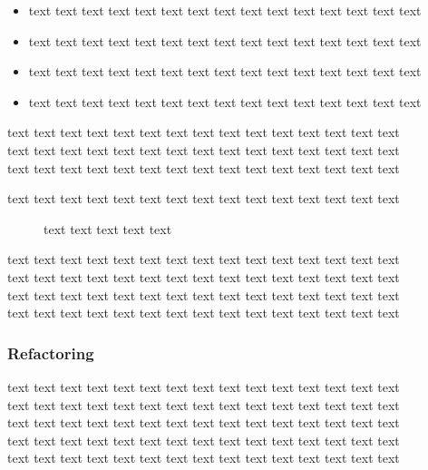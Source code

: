 \documentclass[12pt]{report}
\begin{document}
\begin{enumerate}
\begin{enumerate}
\begin{itemize}
\item text text text text text text text text text text text text text text text\\
\item text text text text text text text text text text text text text text text\\
\item text text text text text text text text text text text text text text text\\
\item text text text text text text text text text text text text text text text\\
\end{itemize}
\end{enumerate}
text text text text text text text text text text text text text text text\\text text text text text text text text text text text text text text text\\text text text text text text text text text text text text text text text\\
\end{enumerate}
text text text text text text text text text text text text text text text\\

\begin{figure}[h]
\centering
{}
\caption{text text text text text}
\end{figure}
text text text text text text text text text text text text text text text\\text text text text text text text text text text text text text text text\\text text text text text text text text text text text text text text text\\text text text text text text text text text text text text text text text\\

\subsubsection{Refactoring}
text text text text text text text text text text text text text text text\\text text text text text text text text text text text text text text text\\text text text text text text text text text text text text text text text\\text text text text text text text text text text text text text text text\\text text text text text text text text text text text text text text text\\
\end{document}
